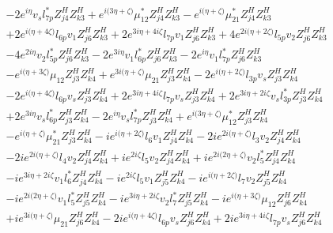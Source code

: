\begin{align}
 &-2 e^{i \eta } v_s l_{7p}^* Z_{{j 4}}^{H} Z_{{k 3}}^{H} +e^{i \Big(3 \eta +\zeta \Big)} \mu_{12}^* Z_{{j 4}}^{H} Z_{{k 3}}^{H} - e^{i \Big(\eta +\zeta \Big)} \mu_{21}^* Z_{{j 4}}^{H} Z_{{k 3}}^{H} \nonumber \\ 
 &+2 e^{i \Big(\eta +4 \zeta \Big)} l_{6p} v_1 Z_{{j 6}}^{H} Z_{{k 3}}^{H} +2 e^{3 i \eta +4 i \zeta } l_{7p} v_1 Z_{{j 6}}^{H} Z_{{k 3}}^{H} +4 e^{2 i \Big(\eta +2 \zeta \Big)} l_{5p} v_2 Z_{{j 6}}^{H} Z_{{k 3}}^{H} \nonumber \\ 
 &-4 e^{2 i \eta } v_2 l_{5p}^* Z_{{j 6}}^{H} Z_{{k 3}}^{H} -2 e^{3 i \eta } v_1 l_{6p}^* Z_{{j 6}}^{H} Z_{{k 3}}^{H} -2 e^{i \eta } v_1 l_{7p}^* Z_{{j 6}}^{H} Z_{{k 3}}^{H} \nonumber \\ 
 &- e^{i \Big(\eta +3 \zeta \Big)} \mu_{12} Z_{{j 3}}^{H} Z_{{k 4}}^{H} +e^{3 i \Big(\eta +\zeta \Big)} \mu_{21} Z_{{j 3}}^{H} Z_{{k 4}}^{H} -2 e^{i \Big(\eta +2 \zeta \Big)} l_{3p} v_s Z_{{j 3}}^{H} Z_{{k 4}}^{H} \nonumber \\ 
 &-2 e^{i \Big(\eta +4 \zeta \Big)} l_{6p} v_s Z_{{j 3}}^{H} Z_{{k 4}}^{H} +2 e^{3 i \eta +4 i \zeta } l_{7p} v_s Z_{{j 3}}^{H} Z_{{k 4}}^{H} +2 e^{3 i \eta +2 i \zeta } v_s l_{3p}^* Z_{{j 3}}^{H} Z_{{k 4}}^{H} \nonumber \\ 
 &+2 e^{3 i \eta } v_s l_{6p}^* Z_{{j 3}}^{H} Z_{{k 4}}^{H} -2 e^{i \eta } v_s l_{7p}^* Z_{{j 3}}^{H} Z_{{k 4}}^{H} +e^{i \Big(3 \eta +\zeta \Big)} \mu_{12}^* Z_{{j 3}}^{H} Z_{{k 4}}^{H} \nonumber \\ 
 &- e^{i \Big(\eta +\zeta \Big)} \mu_{21}^* Z_{{j 3}}^{H} Z_{{k 4}}^{H} -i e^{i \Big(\eta +2 \zeta \Big)} l_6 v_1 Z_{{j 4}}^{H} Z_{{k 4}}^{H} -2 i e^{2 i \Big(\eta +\zeta \Big)} l_3 v_2 Z_{{j 4}}^{H} Z_{{k 4}}^{H} \nonumber \\ 
 &-2 i e^{2 i \Big(\eta +\zeta \Big)} l_4 v_2 Z_{{j 4}}^{H} Z_{{k 4}}^{H} +i e^{2 i \zeta } l_5 v_2 Z_{{j 4}}^{H} Z_{{k 4}}^{H} +i e^{2 i \Big(2 \eta +\zeta \Big)} v_2 l_5^* Z_{{j 4}}^{H} Z_{{k 4}}^{H} \nonumber \\ 
 &-i e^{3 i \eta +2 i \zeta } v_1 l_6^* Z_{{j 4}}^{H} Z_{{k 4}}^{H} -i e^{2 i \zeta } l_5 v_1 Z_{{j 5}}^{H} Z_{{k 4}}^{H} -i e^{i \Big(\eta +2 \zeta \Big)} l_7 v_2 Z_{{j 5}}^{H} Z_{{k 4}}^{H} \nonumber \\ 
 &-i e^{2 i \Big(2 \eta +\zeta \Big)} v_1 l_5^* Z_{{j 5}}^{H} Z_{{k 4}}^{H} -i e^{3 i \eta +2 i \zeta } v_2 l_7^* Z_{{j 5}}^{H} Z_{{k 4}}^{H} -i e^{i \Big(\eta +3 \zeta \Big)} \mu_{12} Z_{{j 6}}^{H} Z_{{k 4}}^{H} \nonumber \\ 
 &+i e^{3 i \Big(\eta +\zeta \Big)} \mu_{21} Z_{{j 6}}^{H} Z_{{k 4}}^{H} -2 i e^{i \Big(\eta +4 \zeta \Big)} l_{6p} v_s Z_{{j 6}}^{H} Z_{{k 4}}^{H} +2 i e^{3 i \eta +4 i \zeta } l_{7p} v_s Z_{{j 6}}^{H} Z_{{k 4}}^{H} \nonumber \\ 

\end{align}
